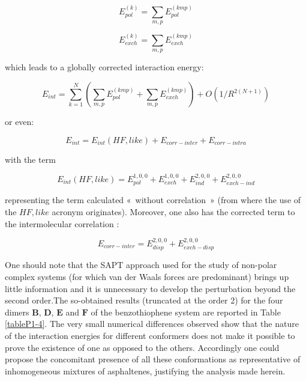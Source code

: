 		\begin{equation}
		E_{pol}^{(k)} = \sum_{m,p} E_{pol}^{(kmp)}
		\end{equation}
		
		\begin{equation}
		E_{exch}^{(k)} = \sum_{m,p} E_{exch}^{(kmp)}
		\end{equation}
		
		which leads to a globally corrected interaction energy: 
		
		\begin{equation}
		E_{int} = \sum_{k=1}^{N} ( \sum_{m,p} E_{pol}^{(kmp)} + \sum_{m,p} E_{exch}^{(kmp)} ) + O(1/R^{2 (N+1)})
		\end{equation}
		
		or even:
		
		\begin{equation}
		E_{int} = E_{int} ({\scriptstyle HF,like}) + E_{corr-inter} + E_{corr-intra}
		\end{equation}
		
		with the term 
		
		\begin{equation}
		E_{int} ({\scriptstyle HF, like}) = E^{1,0,0}_{pol} + E^{1,0,0}_{exch} + E^{2,0,0}_{ind} + E^{2,0,0}_{exch-ind}
		\end{equation}
		
		representing the term calculated « without correlation » (from where the use of the ${\scriptstyle HF, like}$ acronym originates). 
		Moreover, one also has the corrected term to the intermolecular correlation :
		
		\begin{equation}
		E_{corr-inter} = E^{2,0,0}_{disp} + E^{2,0,0}_{exch-disp}
		\end{equation}
		
		One should note that the SAPT approach used for the study of non-polar complex systems (for which van der Waals forces are predominant) brings up little information and it is unnecessary to develop the perturbation beyond the second order.The so-obtained results (truncated at the order 2) for the four dimers $\textbf{B}$, $\textbf{D}$, $\textbf{E}$ and $\textbf{F}$ of the benzothiophene system are reported in Table \ref{tableP1-4}. The very small numerical differences observed show that the nature of the interaction energies for different conformers does not make it possible to prove the existence of one as opposed to the others. Accordingly one could propose the concomitant presence of all these conformations as representative of inhomogeneous mixtures of asphaltenes, justifying the analysis made herein.
		
